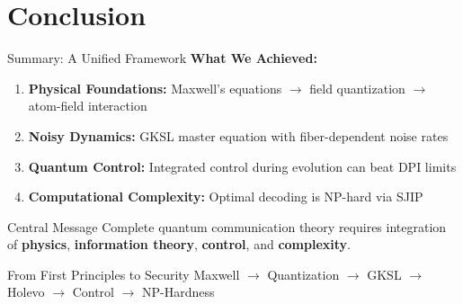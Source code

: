 \documentclass[aspectratio=169,12pt]{beamer}
\begin{document}
\section{Conclusion}

\begin{frame}{Summary: A Unified Framework}
\textbf{What We Achieved:}

\vspace{0.3cm}

\begin{enumerate}
\item \textbf{Physical Foundations:} Maxwell's equations $\to$ field quantization $\to$ atom-field interaction
\item \textbf{Noisy Dynamics:} GKSL master equation with fiber-dependent noise rates
\item \textbf{Quantum Control:} Integrated control during evolution can beat DPI limits
\item \textbf{Computational Complexity:} Optimal decoding is NP-hard via SJIP
\end{enumerate}

\vspace{0.3cm}

\begin{alertblock}{Central Message}
Complete quantum communication theory requires integration of \textbf{physics}, \textbf{information theory}, \textbf{control}, and \textbf{complexity}.
\end{alertblock}

\vspace{0.3cm}

\begin{block}{From First Principles to Security}
Maxwell $\to$ Quantization $\to$ GKSL $\to$ Holevo $\to$ Control $\to$ NP-Hardness
\end{block}
\end{frame}
\end{document}
